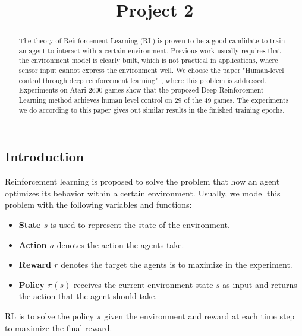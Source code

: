 \documentclass[10pt,twocolumn,letterpaper]{article}
\begin{document}
\begin{CJK}{UTF8}{gbsn}

\title{Project 2}

\author{
}

\maketitle

\begin{abstract}

The theory of Reinforcement Learning (RL) is proven to be a good candidate to train an agent to interact with a certain environment. Previous work usually requires that the environment model is clearly built, which is not practical in applications, where sensor input cannot express the environment well. We choose the paper "Human-level control through deep reinforcement learning"~\cite{mnih2015human}, where this problem is addressed. Experiments on Atari 2600 games show that the proposed Deep Reinforcement Learning method achieves human level control on 29 of the 49 games. The experiments we do according to this paper gives out similar results in the finished training epochs.

\end{abstract}
\section{Introduction}
Reinforcement learning is proposed to solve the problem that how an agent optimizes its behavior within a certain environment. Usually, we model this problem with the following variables and functions:
\begin{itemize}
    \item \textbf{State $s$} is used to represent the state of the environment. 
    \item \textbf{Action $a$} denotes the action the agents take.
    \item \textbf{Reward $r$} denotes the target the agents is to maximize in the experiment.
    \item \textbf{Policy $\pi(s)$} receives the current environment state $s$ as input and returns the action that the agent should take.
\end{itemize}
RL is to solve the policy $\pi$ given the environment and reward at each time step to maximize the final reward.


\end{CJK}
\end{document}
